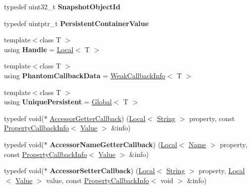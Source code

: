 \begin{DoxyCompactItemize}
\item 
\hypertarget{namespacev8_acc05be0fdcf26b26fbb410e75a048e63}{}typedef uint32\+\_\+t {\bfseries Snapshot\+Object\+Id}\label{namespacev8_acc05be0fdcf26b26fbb410e75a048e63}

\item 
\hypertarget{namespacev8_af40bc0395e06dd22c3bb1328deb94869}{}typedef uintptr\+\_\+t {\bfseries Persistent\+Container\+Value}\label{namespacev8_af40bc0395e06dd22c3bb1328deb94869}

\item 
\hypertarget{namespacev8_a9b42f6a6adfdc70e92717a20a2e99ba3}{}{\footnotesize template$<$class T $>$ }\\using {\bfseries Handle} = \hyperlink{classv8_1_1Local}{Local}$<$ T $>$\label{namespacev8_a9b42f6a6adfdc70e92717a20a2e99ba3}

\item 
\hypertarget{namespacev8_a4ffe352640c281efa614ae5cfb539de5}{}{\footnotesize template$<$class T $>$ }\\using {\bfseries Phantom\+Callback\+Data} = \hyperlink{classv8_1_1WeakCallbackInfo}{Weak\+Callback\+Info}$<$ T $>$\label{namespacev8_a4ffe352640c281efa614ae5cfb539de5}

\item 
\hypertarget{namespacev8_a700d7673ecc33741d51e3d22907e8e3f}{}{\footnotesize template$<$class T $>$ }\\using {\bfseries Unique\+Persistent} = \hyperlink{classv8_1_1Global}{Global}$<$ T $>$\label{namespacev8_a700d7673ecc33741d51e3d22907e8e3f}

\item 
typedef void($\ast$ \hyperlink{namespacev8_a722613c87061708a4f1aa050d095f868}{Accessor\+Getter\+Callback}) (\hyperlink{classv8_1_1Local}{Local}$<$ \hyperlink{classv8_1_1String}{String} $>$ property, const \hyperlink{classv8_1_1PropertyCallbackInfo}{Property\+Callback\+Info}$<$ \hyperlink{classv8_1_1Value}{Value} $>$ \&info)
\item 
\hypertarget{namespacev8_a933dad4c36666875af1843bb98df8379}{}typedef void($\ast$ {\bfseries Accessor\+Name\+Getter\+Callback}) (\hyperlink{classv8_1_1Local}{Local}$<$ \hyperlink{classv8_1_1Name}{Name} $>$ property, const \hyperlink{classv8_1_1PropertyCallbackInfo}{Property\+Callback\+Info}$<$ \hyperlink{classv8_1_1Value}{Value} $>$ \&info)\label{namespacev8_a933dad4c36666875af1843bb98df8379}

\item 
\hypertarget{namespacev8_a926da9728efe528d193a6d36f004777e}{}typedef void($\ast$ {\bfseries Accessor\+Setter\+Callback}) (\hyperlink{classv8_1_1Local}{Local}$<$ \hyperlink{classv8_1_1String}{String} $>$ property, \hyperlink{classv8_1_1Local}{Local}$<$ \hyperlink{classv8_1_1Value}{Value} $>$ value, const \hyperlink{classv8_1_1PropertyCallbackInfo}{Property\+Callback\+Info}$<$ void $>$ \&info)\label{namespacev8_a926da9728efe528d193a6d36f004777e}


\end{DoxyCompactItemize}

